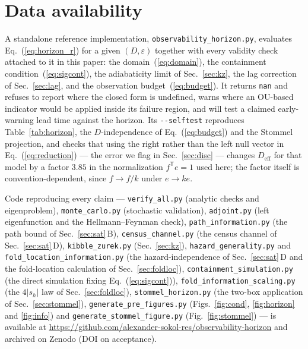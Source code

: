 \documentclass[%
 aip,
 cha,
 amsmath,amssymb,
 reprint,
 superscriptaddress,
 floatfix,
]{revtex4-2}
\begin{document}
\section*{Data availability}
A standalone reference implementation, \texttt{observability\_\allowbreak horizon.py}, evaluates
Eq.~(\ref{eq:horizon_r}) for a given $(D,\varepsilon)$ together with every validity check
attached to it in this paper: the domain~(\ref{eq:domain}), the containment
condition~(\ref{eq:sigcont}), the adiabaticity limit of Sec.~\ref{sec:kz}, the
lag correction of Sec.~\ref{sec:lag}, and the observation budget~(\ref{eq:budget}).  It
returns \texttt{nan} and refuses to report where the closed form is undefined, warns where
an OU-based indicator would be applied inside its failure region, and will test a claimed
early-warning lead time against the horizon.  Its \texttt{-\/-selftest} reproduces
Table~\ref{tab:horizon}, the $D$-independence of Eq.~(\ref{eq:budget}) and the Stommel
projection, and checks that using the right rather than the left null vector in
Eq.~(\ref{eq:reduction}) --- the error we flag in Sec.~\ref{sec:disc} --- changes
$D_{\mathrm{eff}}$ for that model by a factor $3.85$ in the normalization
$f^{\mathsf T}e=1$ used here; the factor itself is convention-dependent,
since $f\to f/k$ under $e\to ke$.

Code reproducing every claim --- \texttt{verify\_\allowbreak all.py} (analytic checks and eigenproblem),
\texttt{monte\_\allowbreak carlo.py} (stochastic validation), \texttt{adjoint.py} (left eigenfunction and
the Hellmann--Feynman check), \texttt{path\_\allowbreak information.py} (the path bound of
Sec.~\ref{sec:sat}\,B), \texttt{census\_\allowbreak channel.py} (the census channel of Sec.~\ref{sec:sat}\,D),
\texttt{kibble\_\allowbreak zurek.py} (Sec.~\ref{sec:kz}), \texttt{hazard\_\allowbreak generality.py} and
\texttt{fold\_\allowbreak location\_\allowbreak information.py} (the hazard-independence of Sec.~\ref{sec:sat}\,D and the
fold-location calculation of Sec.~\ref{sec:foldloc}), \texttt{containment\_\allowbreak simulation.py} (the direct simulation fixing Eq.~(\ref{eq:sigcont})),
\texttt{fold\_\allowbreak information\_\allowbreak scaling.py} (the $4|s_h|$ law of Sec.~\ref{sec:foldloc}),
\texttt{stommel\_\allowbreak horizon.py} (the two-box
application of Sec.~\ref{sec:stommel}), \texttt{generate\_\allowbreak pre\_\allowbreak figures.py}
(Figs.~\ref{fig:cond}, \ref{fig:horizon} and \ref{fig:info}) and
\texttt{generate\_\allowbreak stommel\_\allowbreak figure.py} (Fig.~\ref{fig:stommel}) --- is
available at \url{https://github.com/alexander-sokol-res/observability-horizon} and archived
on Zenodo (DOI on acceptance).

\appendix



\end{document}

